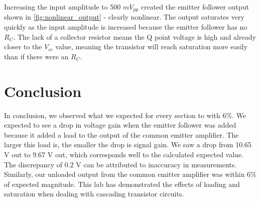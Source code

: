 \documentclass[12pt,letterpaper]{report}
\begin{document}
Increasing the input amplitude to 500 $mV_{pp}$ created the emitter follower output shown in \ref{fig:nonlinear_output} - clearly nonlinear. The output saturates very quickly as the input amplitude is increased because the emitter follower has no $R_C$. The lack of a collector resistor means the Q point voltage is high and already closer to the $V_{cc}$ value, meaning the transistor will reach saturation more easily than if there were an $R_C$.

\section*{Conclusion}
In conclusion, we observed what we expected for every section to with 6\%. We expected to see a drop in voltage gain when the emitter follower was added because it added a load to the output of the common emitter amplifier. The larger this load is, the smaller the drop is signal gain. We saw a drop from 10.65 V out to 9.67 V out, which corresponds well to the calculated expected value. The discrepancy of 0.2 V can be attributed to inaccuracy in measurements. Similarly, our unloaded output from the common emitter amplifier was within 6\% of expected magnitude. This lab has demonstrated the effects of loading and saturation when dealing with cascading transistor circuits.
\end{document}
